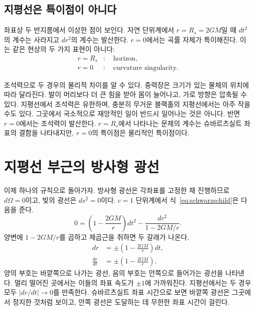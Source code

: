 
\subsection{지평선은 특이점이 아니다}

좌표상 두 반지름에서 이상한 점이 보인다. 자연 단위계에서 \(r=R_s=2GM\)일 때 \(dt^2\)의 계수는 사라지고 \(dr^2\)의 계수는 발산한다. \(r=0\)에서는 곡률 자체가 특이해진다. 이는 같은 현상의 두 가지 표현이 아니다:
\begin{equation}
\begin{aligned}
r=R_s &:\quad \text{horizon},\\
r=0 &:\quad \text{curvature singularity}.
\end{aligned}
\end{equation}

조석력으로 두 경우의 물리적 차이를 알 수 있다. 중력장은 크기가 있는 물체의 위치에 따라 달라진다. 발이 머리보다 더 큰 힘을 받아 몸이 늘어나고, 가로 방향은 압축될 수 있다. 지평선에서 조석력은 유한하며, 충분히 무거운 블랙홀의 지평선에서는 아주 작을 수도 있다. 그곳에서 국소적으로 재앙적인 일이 반드시 일어나는 것은 아니다. 반면 \(r=0\)에서는 조석력이 발산한다. \(r=R_s\)에서 나타나는 문제의 계수는 슈바르츠실트 좌표의 결함을 나타내지만, \(r=0\)의 특이점은 물리적인 특이점이다.


\section{지평선 부근의 방사형 광선}

이제 하나의 규칙으로 돌아가자. 방사형 광선은 각좌표를 고정한 채 진행하므로 \(d\Omega=0\)이고, 빛의 광선은 \(ds^2=0\)이다. \(c=1\) 단위계에서 식~\eqref{eq:schwarzschild}은 다음을 준다.
\begin{equation}
0=\left(1-\frac{2GM}{r}\right)dt^2
-\frac{dr^2}{1-2GM/r}.
\end{equation}
양변에 \(1-2GM/r\)를 곱하고 제곱근을 취하면 두 갈래가 나온다.
\begin{align}
dr&=\pm\left(1-\frac{2GM}{r}\right)dt,\\
\frac{dr}{dt}&=\pm\left(1-\frac{2GM}{r}\right).
\label{eq:radial-null}
\end{align}
양의 부호는 바깥쪽으로 나가는 광선, 음의 부호는 안쪽으로 들어가는 광선을 나타낸다. 멀리 떨어진 곳에서는 이들의 좌표 속도가 \(\pm1\)에 가까워진다. 지평선에서는 두 경우 모두 \(\lvert dr/dt\rvert\to0\)를 만족한다. 슈바르츠실트 좌표 시간으로 보면 바깥쪽 광선은 그곳에서 정지한 것처럼 보이고, 안쪽 광선은 도달하는 데 무한한 좌표 시간이 걸린다.

